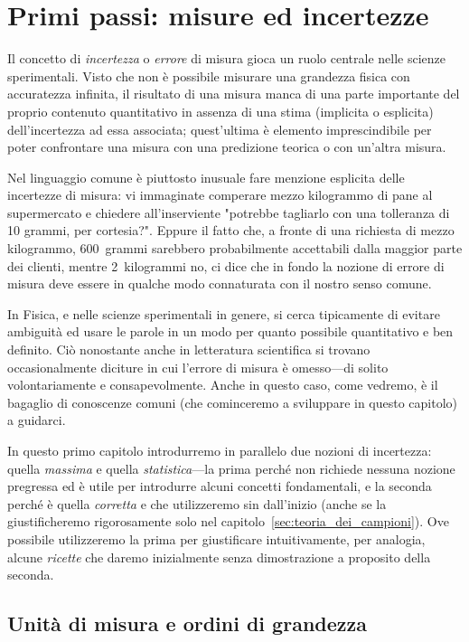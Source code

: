 \chapter{Primi passi: misure ed incertezze}
\label{sec:primi_passi}

Il concetto di \emph{incertezza} o \emph{errore} di misura gioca un ruolo centrale
nelle scienze sperimentali. Visto che non è possibile misurare una grandezza fisica
con accuratezza infinita, il risultato di una misura manca di una parte importante
del proprio contenuto quantitativo in assenza di una stima (implicita o esplicita)
dell'incertezza ad essa associata; quest'ultima è elemento imprescindibile per
poter confrontare una misura con una predizione teorica o con un'altra misura.

Nel linguaggio comune è piuttosto inusuale fare menzione esplicita delle
incertezze di misura: vi immaginate comperare mezzo kilogrammo di pane al
supermercato e chiedere all'inserviente
"potrebbe tagliarlo con una tolleranza di 10 grammi, per cortesia?".
Eppure il fatto che, a fronte di una richiesta di mezzo kilogrammo, 600~grammi
sarebbero probabilmente accettabili dalla maggior parte dei clienti, mentre
2~kilogrammi no, ci dice che in fondo la nozione di errore di misura deve
essere in qualche modo connaturata con il nostro senso comune.

In Fisica, e nelle scienze sperimentali in genere, si cerca tipicamente di
evitare ambiguità ed usare le parole in un modo per quanto possibile
quantitativo e ben definito. Ciò nonostante anche in letteratura scientifica
si trovano occasionalmente diciture in cui l'errore di misura è omesso---di
solito volontariamente e consapevolmente. Anche in questo caso, come vedremo,
è il bagaglio di conoscenze comuni (che cominceremo a sviluppare in questo
capitolo) a guidarci.

In questo primo capitolo introdurremo in parallelo due nozioni di incertezza:
quella \emph{massima} e quella \emph{statistica}---la prima perché non
richiede nessuna nozione pregressa ed è utile per introdurre alcuni concetti
fondamentali, e la seconda perché è quella \emph{corretta} e che
utilizzeremo sin dall'inizio (anche se la giustificheremo rigorosamente solo
nel capitolo~\ref{sec:teoria_dei_campioni}). Ove possibile utilizzeremo la prima
per giustificare intuitivamente, per analogia, alcune \emph{ricette} che daremo
inizialmente senza dimostrazione a proposito della seconda.


\section{Unità di misura e ordini di grandezza}
\label{sec:unita_di_misura}

